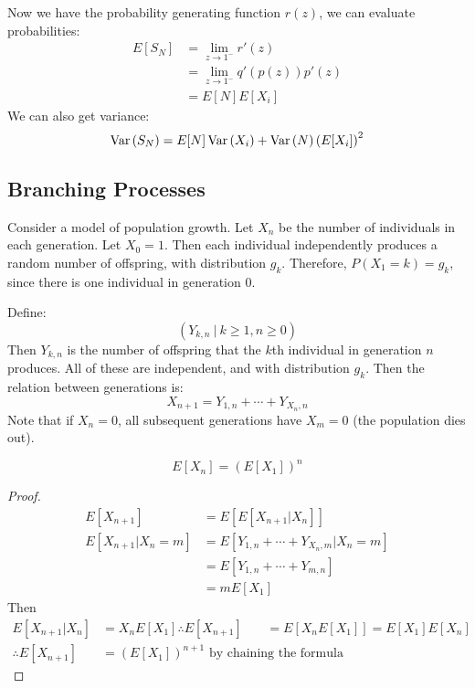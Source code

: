 \documentclass[../Main.tex]{subfiles}
\begin{document}
Now we have the probability generating function $r(z)$, we can evaluate probabilities:
\begin{align*}
    E[S_N] &= \lim_{z \to 1^-} r'(z) \\
    &= \lim_{z \to 1^-} q'(p(z)) p'(z) \\
    &= E[N] E[X_i]
\end{align*}
We can also get variance:
\begin{equation*}
    \operatorname{Var}{(S_N)} = E[N] \operatorname{Var}{(X_i)} + \operatorname{Var}{(N)} \left(E[X_i]\right)^2
\end{equation*}
\subsection{Branching Processes}
Consider a model of population growth. Let $X_n$ be the number of individuals in each generation. Let $X_0 = 1$. Then each individual independently produces a random number of offspring, with distribution $g_k$. Therefore, $P(X_1 = k) = g_k$, since there is one individual in generation $0$.\par
Define:
\begin{equation*}
    \left(Y_{k, n}~|~k \geq 1, n \geq 0\right)
\end{equation*}
Then $Y_{k, n}$ is the number of offspring that the $k$th individual in generation $n$ produces. All of these are independent, and with distribution $g_k$. Then the relation between generations is:
\begin{equation*}
    X_{n + 1} = Y_{1, n} + \cdots + Y_{{X_n}, n}
\end{equation*}
Note that if $X_n = 0$, all subsequent generations have $X_m = 0$ (the population dies out).
\begin{theorem}
    \begin{equation*}
        E[X_n] = \left(E[X_1]\right)^n
    \end{equation*}
    \label{thmBranchingExpectation}
\end{theorem}
\begin{proof}
    \begin{align*}
        E[X_{n + 1}] &= E[E[X_{n + 1} | X_n]] \\
        E[X_{n + 1} | X_n = m] &= E[Y_{1, n} + \cdots + Y_{{X_n}, m} | X_n = m] \\
        &= E[Y_{1, n} + \cdots + Y_{m, n}] \\
        &= mE[X_1]
    \end{align*}
    Then
    \begin{align*}
        E[X_{n + 1} | X_n] &= X_n E[X_1]
        \therefore E[X_{n + 1}] &= E[X_n E[X_1]] = E[X_1] E[X_n] \\
        \therefore E[X_{n + 1}] &= \left(E[X_1]\right)^{n + 1} \text{ by chaining the formula}
    \end{align*}
\end{proof}
\end{document}
